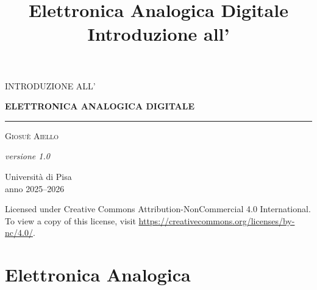 \documentclass[11pt,a4paper]{report}
\title{\color{notered}\textbf{Elettronica Analogica Digitale}\\[0.3em]\large Introduzione all'}
\author{}
\date{}
\begin{document}
\begin{titlepage}
  \centering
  \vspace*{0.8cm}
  {\Large\scshape\color{notedarkred}INTRODUZIONE ALL'\par}
  \vspace{0.6cm}
  {\Huge\bfseries\color{notered}\MakeUppercase{Elettronica Analogica Digitale}\par}
  \vspace{0.8cm}
  {\color{notered}\rule{8cm}{1.2pt}\par}
  \vspace{1.2cm}
  {\Large\scshape Giosu\`e Aiello\par}
  \vfill
  \noindent
  \begin{minipage}[b]{0.5\linewidth}
    \textit{versione 1.0}
  \end{minipage}%
  \begin{minipage}[b]{0.5\linewidth}
    \raggedleft
    Universit\`a di Pisa\\
    anno 2025--2026
  \end{minipage}
  \thispagestyle{empty}
\end{titlepage}

\vspace*{\fill}
\noindent {\Large \ccbync} Licensed under Creative Commons Attribution-NonCommercial 4.0 International. \\ To view a copy of this license, visit \url{https://creativecommons.org/licenses/by-nc/4.0/}.
\newpage

{\hypersetup{linkcolor=black}
\tableofcontents
\newpage}

\part{Elettronica Analogica}









\end{document}
